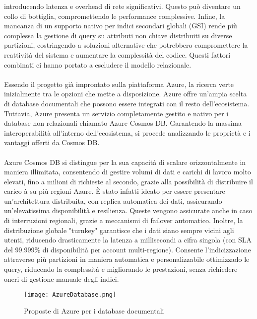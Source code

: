 introducendo latenza e overhead di rete significativi.
Questo può diventare un collo di bottiglia, compromettendo le performance complessive.
Infine, la mancanza di un supporto nativo per indici secondari globali (GSI)
rende più complessa la gestione di query su attributi non chiave distribuiti su diverse partizioni,
costringendo a soluzioni alternative che potrebbero compromettere
la reattività del sistema e aumentare la complessità del codice.
Questi fattori combinati ci hanno portato a escludere il modello relazionale.\\
\\
Essendo il progetto già improntato sulla piattaforma Azure,
la ricerca verte inizialmente tra le opzioni che mette a disposizione.
Azure offre un’ampia scelta di database documentali che possono essere integrati con il resto dell’ecosistema.
Tuttavia, Azure presenta un servizio completamente gestito e nativo
per i database non relazionali chiamato Azure Cosmos DB.
Garantendo la massima interoperabilità all'interno dell'ecosistema,
si procede analizzando le proprietà e i vantaggi offerti da Cosmos DB.\\
\\
Azure Cosmos DB si distingue per la sua capacità di scalare orizzontalmente in maniera illimitata,
consentendo di gestire volumi di dati e carichi di lavoro molto elevati,
fino a milioni di richieste al secondo,
grazie alla possibilità di distribuire il carico à su più regioni Azure.
È stato infatti ideato per essere presentare un'architettura distribuita,
con replica automatica dei dati,
assicurando un'elevatissima disponibilità e resilienza.
Queste vengono assicurate anche in caso di interruzioni regionali,
grazie a meccanismi di failover automatico.
Inoltre, la distribuzione globale "turnkey" garantisce che i dati siano sempre vicini agli utenti,
riducendo drasticamente la latenza a millisecondi a cifra singola
(con SLA del 99.999\% di disponibilità per account multi-regione).
Consente l'indicizzazione attraverso più partizioni in maniera
automatica e personalizzabile ottimizzado le query,
riducendo la complessità e migliorando le prestazioni,
senza richiedere oneri di gestione manuale degli indici.\\
\begin{figure}[h!]
    \centering
    \texttt{[image: AzureDatabase.png]}
    \caption{Proposte di Azure per i database documentali}
\end{figure}


